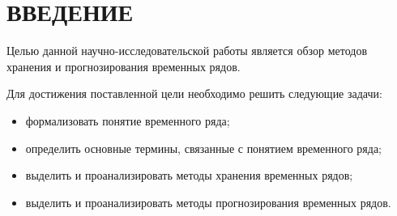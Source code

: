 \chapter*{ВВЕДЕНИЕ}

Целью данной научно-исследовательской работы является обзор методов хранения и 
прогнозирования временных рядов.

Для достижения поставленной цели необходимо решить следующие задачи:

\begin{itemize}[label=—]
	\item формализовать понятие временного ряда;
	\item определить основные термины, связанные с понятием временного ряда;
	\item выделить и проанализировать методы хранения временных рядов;
	\item выделить и проанализировать методы прогнозирования временных рядов.
\end{itemize}